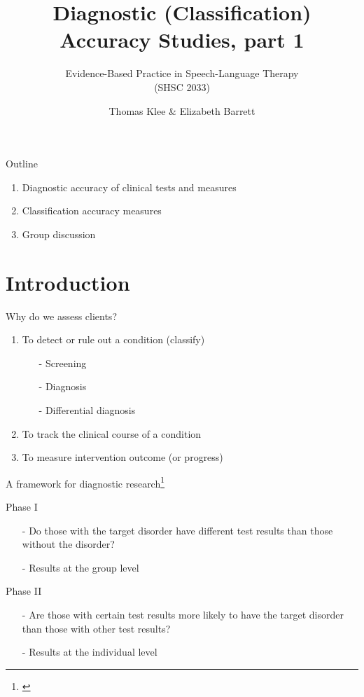 \documentclass{beamer}
\title{Diagnostic (Classification) Accuracy Studies, part 1}
\subtitle{}
\author{Evidence-Based Practice in Speech-Language Therapy \\ (SHSC 2033)}
\institute{Session 8}
\date{Thomas Klee \& Elizabeth Barrett}
\begin{document}
\begin{frame}
	\titlepage
\end{frame}

\begin{frame}{Outline}
	\begin{enumerate}
	\item Diagnostic accuracy of clinical tests and measures
	\item Classification accuracy measures
	\item Group discussion
	\end {enumerate}
\end{frame}

\section{Introduction}

\begin{frame}{Why do we  assess clients?}
	\begin{enumerate}
	\item To detect or rule out a condition (classify)
		\begin{itemize}
		\item[-] Screening
		\item[-] Diagnosis
		\item[-] Differential diagnosis
		\end{itemize}
	\item To track the clinical course of a condition
	\item To measure intervention outcome (or progress)
	\end{enumerate}
\end{frame}

\begin{frame}{A framework for diagnostic research\footnote{\tiny{\citet{Sackett2002a}}}}
	\begin{block}{Phase I}
		\begin{itemize}
		\item[-]  Do those with the target disorder have different test results than those without the disorder?
		\item[-]  Results at the group level
		\end{itemize}
	\end{block}
	
	\begin{block}{Phase II}
		\begin{itemize}
		\item[-] Are those with certain test results more likely to have the target disorder than those with other test results? \\
		\item[-] Results at the individual level
		\end{itemize}
	\end{block}
\end{frame}
\end{document}
